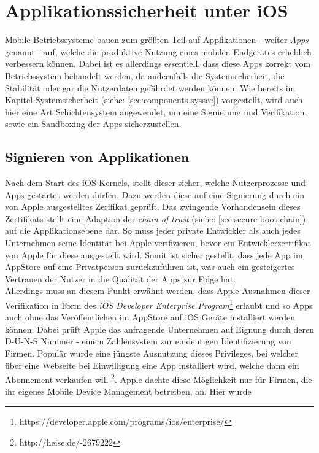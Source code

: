 \section{Applikationssicherheit unter iOS}
	Mobile Betriebssysteme bauen zum größten Teil auf Applikationen - weiter
	\textsl{Apps} genannt - auf, welche die produktive Nutzung eines mobilen
	Endgerätes erheblich verbessern können. Dabei ist es allerdings
	essentiell, dass diese Apps korrekt vom Betriebssystem behandelt werden, da
	andernfalls die Systemsicherheit, die Stabilität oder gar die Nutzerdaten
	gefährdet werden können. Wie bereits im Kapitel Systemsicherheit (siehe:
	\ref{sec:components-syssec}) vorgestellt, wird auch hier eine Art
	Schichtensystem angewendet, um eine Signierung und Verifikation, sowie ein
	Sandboxing der Apps sicherzustellen.
	
	\subsection{Signieren von Applikationen}
		Nach dem Start des iOS Kernels, stellt dieser sicher, welche Nutzerprozesse
		und Apps gestartet werden dürfen. Dazu werden diese auf eine Signierung durch
		ein von Apple ausgestelltes Zerifikat geprüft. Das zwingende Vorhandensein
		dieses Zertifikats stellt eine Adaption der \textsl{chain of trust} (siehe:
		\ref{sec:secure-boot-chain}) auf die Applikationsebene dar. So muss jeder
		private Entwickler als auch jedes Unternehmen seine Identität bei Apple
		verifizieren, bevor ein Entwicklerzertifikat von Apple für diese ausgestellt
		wird. Somit ist sicher gestellt, dass jede App im AppStore auf eine
		Privatperson zurückzuführen ist, was auch ein gesteigertes Vertrauen der
		Nutzer in die Qualität der Apps zur Folge hat.\\
		Allerdings muss an diesem Punkt erwähnt werden, dass Apple Ausnahmen dieser
		Verifikation in Form des \textsl{iOS Developer Enterprise
		Program}\footnote{https://developer.apple.com/programs/ios/enterprise/}
		erlaubt und so Apps auch ohne das Veröffentlichen im AppStore auf iOS Geräte
		installiert werden können. Dabei prüft Apple das anfragende Unternehmen auf
		Eignung durch deren D-U-N-S Nummer - einem Zahlensystem zur eindeutigen
		Identifizierung von Firmen. Populär wurde eine jüngste Ausnutzung dieses
		Privileges, bei welcher über eine Webseite bei Einwilligung eine App
		installiert wird, welche dann ein Abonnement verkaufen will
		\footnote{http://heise.de/-2679222}. Apple dachte diese Möglichkeit nur für
		Firmen, die ihr eigenes Mobile Device Management betreiben, an. Hier wurde

